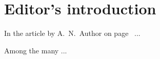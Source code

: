 \documentclass[colclass=epsilonj]{combine}
\begin{document}
\pagestyle{combine}

\tableofcontents
\clearpage
\section{Editor’s introduction} \label{intro}
In the article by A.~N.~Author on page~\pageref{art1} ...
\begin{papers}
\label{art1}

\label{art2}

\end{papers} %
Among the many ...
\end{document}
